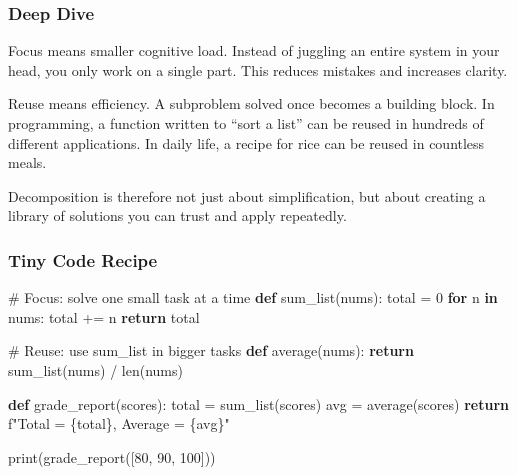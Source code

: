 \documentclass[
  letterpaper,
  DIV=11,
  numbers=noendperiod]{scrreprt}
\newenvironment{Shaded}{\begin{snugshade}}{\end{snugshade}}
\newcommand{\BuiltInTok}[1]{\textcolor[rgb]{0.00,0.23,0.31}{#1}}
\newcommand{\CommentTok}[1]{\textcolor[rgb]{0.37,0.37,0.37}{#1}}
\newcommand{\ControlFlowTok}[1]{\textcolor[rgb]{0.00,0.23,0.31}{\textbf{#1}}}
\newcommand{\DecValTok}[1]{\textcolor[rgb]{0.68,0.00,0.00}{#1}}
\newcommand{\KeywordTok}[1]{\textcolor[rgb]{0.00,0.23,0.31}{\textbf{#1}}}
\newcommand{\NormalTok}[1]{\textcolor[rgb]{0.00,0.23,0.31}{#1}}
\newcommand{\OperatorTok}[1]{\textcolor[rgb]{0.37,0.37,0.37}{#1}}
\newcommand{\SpecialCharTok}[1]{\textcolor[rgb]{0.37,0.37,0.37}{#1}}
\newcommand{\SpecialStringTok}[1]{\textcolor[rgb]{0.13,0.47,0.30}{#1}}
\begin{document}
\subsubsection{Deep Dive}\label{deep-dive-5}

Focus means smaller cognitive load. Instead of juggling an entire system
in your head, you only work on a single part. This reduces mistakes and
increases clarity.

Reuse means efficiency. A subproblem solved once becomes a building
block. In programming, a function written to ``sort a list'' can be
reused in hundreds of different applications. In daily life, a recipe
for rice can be reused in countless meals.

Decomposition is therefore not just about simplification, but about
creating a library of solutions you can trust and apply repeatedly.

\subsubsection{Tiny Code Recipe}\label{tiny-code-recipe-33}

\begin{Shaded}
\begin{Highlighting}[]
\CommentTok{\# Focus: solve one small task at a time}
\KeywordTok{def}\NormalTok{ sum\_list(nums):}
\NormalTok{    total }\OperatorTok{=} \DecValTok{0}
    \ControlFlowTok{for}\NormalTok{ n }\KeywordTok{in}\NormalTok{ nums:}
\NormalTok{        total }\OperatorTok{+=}\NormalTok{ n}
    \ControlFlowTok{return}\NormalTok{ total}

\CommentTok{\# Reuse: use sum\_list in bigger tasks}
\KeywordTok{def}\NormalTok{ average(nums):}
    \ControlFlowTok{return}\NormalTok{ sum\_list(nums) }\OperatorTok{/} \BuiltInTok{len}\NormalTok{(nums)}

\KeywordTok{def}\NormalTok{ grade\_report(scores):}
\NormalTok{    total }\OperatorTok{=}\NormalTok{ sum\_list(scores)}
\NormalTok{    avg }\OperatorTok{=}\NormalTok{ average(scores)}
    \ControlFlowTok{return} \SpecialStringTok{f"Total = }\SpecialCharTok{\{}\NormalTok{total}\SpecialCharTok{\}}\SpecialStringTok{, Average = }\SpecialCharTok{\{}\NormalTok{avg}\SpecialCharTok{\}}\SpecialStringTok{"}

\BuiltInTok{print}\NormalTok{(grade\_report([}\DecValTok{80}\NormalTok{, }\DecValTok{90}\NormalTok{, }\DecValTok{100}\NormalTok{]))}
\end{Highlighting}
\end{Shaded}
\end{document}
